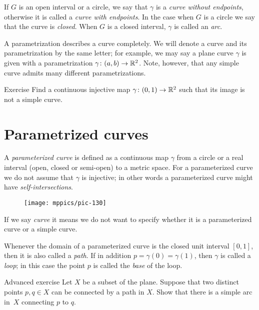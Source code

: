 If $G$ is an open interval or a circle, we say that $\gamma$ is a \emph{curve without endpoints}, otherwise it is 
called a {}\emph{curve with endpoints}.
In the case when $G$ is a circle we say that the curve is \emph{closed}. 
When $G$ is a closed interval, $\gamma$ is called an \emph{arc}.


A parametrization describes a curve completely.
We will denote a curve and its parametrization by the same letter;
for example, we may say a plane curve $\gamma$ is given with a parametrization $\gamma\:(a,b)\z\to \RR^2$.
Note, however, that any simple curve admits many different parametrizations. 

\begin{thm}{Exercise}\label{ex:9}
Find a continuous injective map $\gamma\colon(0,1)\to\mathbb{R}^2$ such that its image is not a simple curve.
\end{thm}


\section{Parametrized curves}

A \emph{parameterized curve} is defined as a continuous map $\gamma$ from a circle or a real interval (open, closed or semi-open) to a metric space. 
For a parameterized curve we do not assume that $\gamma$ is injective; in other words a parameterized curve might have \emph{self-intersections}.

\begin{wrapfigure}{o}{17 mm}
\vskip-3mm
\centering
\texttt{[image: mppics/pic-130]}
\end{wrapfigure}

If we say \emph{curve} it means we do not want to specify whether it is a parameterized curve or a simple curve.

Whenever the domain of a parameterized curve is the closed unit interval $[0,1]$, then it is also called a \emph{path}.
If in addition $p=\gamma(0)=\gamma(1)$, then $\gamma$ is called a \emph{loop};
in this case the point $p$ is called the \emph{base} of the loop.

\begin{thm}{Advanced exercise}\label{aex:simple-curve}
Let $X$ be a subset of the plane.
Suppose that two distinct points $p,q\in X$ can be connected by a path in $X$.
Show that there is a simple arc in~$X$ connecting $p$ to $q$.
\end{thm}

